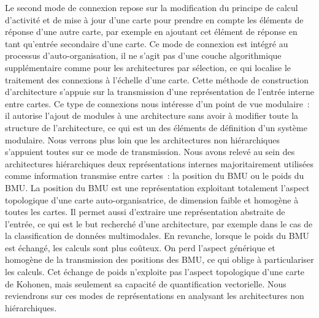 \documentclass[../main]{subfiles}
\begin{document}
Le second mode de connexion repose sur la modification du principe de calcul d'activité et de mise à jour d'une carte pour prendre en compte les éléments de réponse d'une autre carte, par exemple en ajoutant cet élément de réponse en tant qu'entrée secondaire d'une carte.
Ce mode de connexion est intégré au processus d'auto-organisation, il ne s'agit pas d'une couche algorithmique supplémentaire comme pour les architectures par sélection, ce qui localise le traitement des connexions à l'échelle d'une carte. 
Cette méthode de construction d'architecture s'appuie sur la transmission d'une représentation de l'entrée interne entre cartes.
Ce type de connexions nous intéresse d'un point de vue modulaire~: il autorise l'ajout de modules à une architecture sans avoir à modifier toute la structure de l'architecture, ce qui est un des éléments de définition d'un système modulaire.
Nous verrons plus loin que les architectures non hiérarchiques s'appuient toutes sur ce mode de transmission.
Nous avons relevé au sein des architectures hiérarchiques deux représentations internes majoritairement utilisées comme information transmise entre cartes~: la position du BMU ou le poids du BMU. La position du BMU est une représentation exploitant totalement l'aspect topologique d'une carte auto-organisatrice, de dimension faible et homogène à toutes les cartes. Il permet aussi d'extraire une représentation abstraite de l'entrée, ce qui est le but recherché d'une architecture, par exemple dans le cas de la classification de données multimodales.
En revanche, lorsque le poids du BMU est échangé, les calculs sont plus coûteux. On perd l'aspect générique et homogène de la transmission des positions des BMU, ce qui oblige à particulariser les calculs. Cet échange de poids n'exploite pas l'aspect topologique d'une carte de Kohonen, mais seulement sa capacité de quantification vectorielle.
Nous reviendrons sur ces modes de représentations en analysant les architectures non hiérarchiques.
\end{document}
